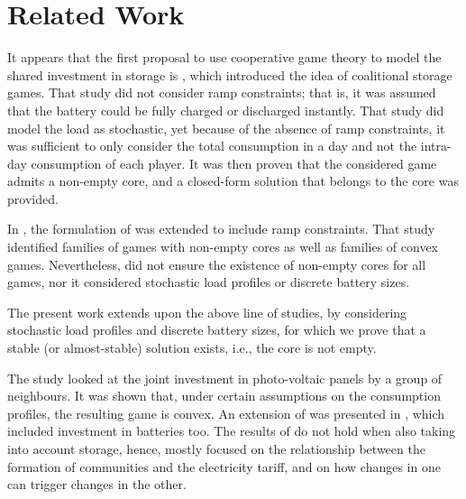 \documentclass[sigconf, table]{acmart}
\begin{document}



\section{Related Work}

It appears that the first proposal to use cooperative game theory to model the shared investment in storage is \cite{chakraborty2018}, which introduced the idea of coalitional storage games. That study did not consider ramp constraints; that is, it was assumed that the battery could be fully charged or discharged instantly. That study did model the load as stochastic, yet because of the absence of ramp constraints, it was sufficient to only consider the total consumption in a day and not the intra-day consumption of each player. It was then proven that the considered game admits a non-empty core, and a closed-form solution that belongs to the core was provided.

In \cite{kiedanskigames}, the formulation of \cite{chakraborty2018} was extended to include ramp constraints. That study identified families of games with non-empty cores as well as families of convex games. Nevertheless, \cite{kiedanskigames} did not ensure the existence of non-empty cores for all games, nor it considered stochastic load profiles or discrete battery sizes.


The present work extends upon the above line of studies, by considering stochastic load profiles and discrete battery sizes, for which we prove that a stable (or almost-stable) solution exists, i.e., the core is not empty.

The study \cite{RePEc:cam:camdae:1740} looked at the joint investment in photo-voltaic panels by a group of neighbours. It was shown that, under certain assumptions on the consumption profiles, the resulting game is convex. An extension of \cite{RePEc:cam:camdae:1740} was presented in \cite{RePEc:cam:camdae:1828:snowball}, which included investment in batteries too. The results of \cite{RePEc:cam:camdae:1740} do not hold when also taking into account storage, hence, \cite{RePEc:cam:camdae:1828:snowball} mostly focused on the relationship between the formation of communities and the electricity tariff, and on how changes in one can trigger changes in the other.
\end{document}
